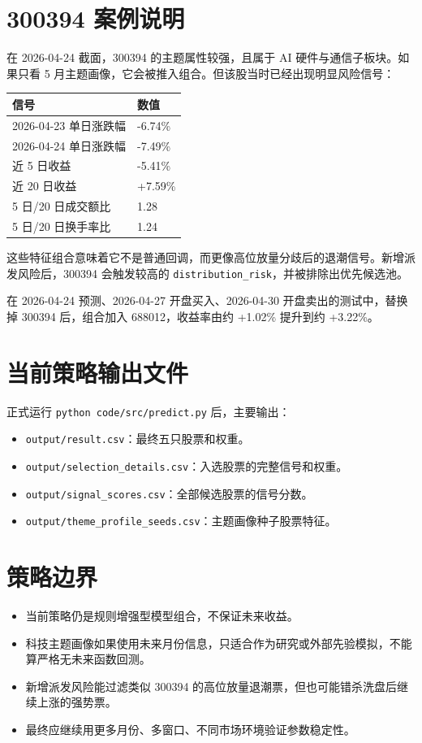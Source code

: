 \documentclass[UTF8,zihao=-4]{ctexart}
\begin{document}
\section{300394 案例说明}

在 2026-04-24 截面，300394 的主题属性较强，且属于 AI 硬件与通信子板块。如果只看 5 月主题画像，它会被推入组合。但该股当时已经出现明显风险信号：

\begin{longtable}{p{7cm} p{5cm}}
\toprule
信号 & 数值 \\
\midrule
2026-04-23 单日涨跌幅 & -6.74\% \\
2026-04-24 单日涨跌幅 & -7.49\% \\
近 5 日收益 & -5.41\% \\
近 20 日收益 & +7.59\% \\
5 日/20 日成交额比 & 1.28 \\
5 日/20 日换手率比 & 1.24 \\
\bottomrule
\end{longtable}

这些特征组合意味着它不是普通回调，而更像高位放量分歧后的退潮信号。新增派发风险后，300394 会触发较高的 \texttt{distribution\_risk}，并被排除出优先候选池。

在 2026-04-24 预测、2026-04-27 开盘买入、2026-04-30 开盘卖出的测试中，替换掉 300394 后，组合加入 688012，收益率由约 +1.02\% 提升到约 +3.22\%。

\section{当前策略输出文件}

正式运行 \texttt{python code/src/predict.py} 后，主要输出：

\begin{itemize}
  \item \texttt{output/result.csv}：最终五只股票和权重。
  \item \texttt{output/selection\_details.csv}：入选股票的完整信号和权重。
  \item \texttt{output/signal\_scores.csv}：全部候选股票的信号分数。
  \item \texttt{output/theme\_profile\_seeds.csv}：主题画像种子股票特征。
\end{itemize}

\section{策略边界}

\begin{itemize}
  \item 当前策略仍是规则增强型模型组合，不保证未来收益。
  \item 科技主题画像如果使用未来月份信息，只适合作为研究或外部先验模拟，不能算严格无未来函数回测。
  \item 新增派发风险能过滤类似 300394 的高位放量退潮票，但也可能错杀洗盘后继续上涨的强势票。
  \item 最终应继续用更多月份、多窗口、不同市场环境验证参数稳定性。
\end{itemize}
\end{document}
